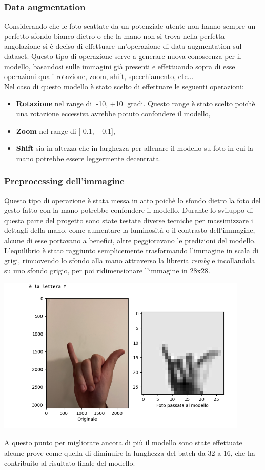 \documentclass{article}
\begin{document}
\subsubsection{Data augmentation}
Considerando che le foto scattate da un potenziale utente non hanno sempre un perfetto sfondo bianco dietro o che la mano non si trova nella perfetta angolazione si è deciso di effettuare un'operazione di data augmentation sul dataset. Questo tipo di operazione serve a generare nuova conoscenza per il modello, basandosi sulle immagini già presenti e effettuando sopra di esse operazioni quali rotazione, zoom, shift, specchiamento, etc... \\
Nel caso di questo modello è stato scelto di effettuare le seguenti operazioni:
\begin{itemize}
    \item \textbf{Rotazione} nel range di [-10, +10] gradi. Questo range è stato scelto poichè una rotazione eccessiva avrebbe potuto confondere il modello,
    \item \textbf{Zoom} nel range di [-0.1, +0.1],
    \item \textbf{Shift} sia in altezza che in larghezza per allenare il modello su foto in cui la mano potrebbe essere leggermente decentrata.
\end{itemize}
\subsubsection{Preprocessing dell'immagine}
Questo tipo di operazione è stata messa in atto poichè lo sfondo dietro la foto del gesto fatto con la mano potrebbe confondere il modello. Durante lo sviluppo di questa parte del progetto sono state testate diverse tecniche per massimizzare i dettagli della mano, come aumentare la luminosità o il contrasto dell'immagine, alcune di esse portavano a benefici, altre peggioravano le predizioni del modello.\\
L'equilibrio è stato raggiunto semplicemente trasformando l'immagine in scala di grigi, rimuovendo lo sfondo alla mano attraverso la libreria \textit{rembg} e incollandola su uno sfondo grigio, per poi ridimensionare l'immagine in 28x28.
\begin{center}
    \includegraphics[width=0.9\textwidth]{preprocess.png}
\end{center}
A questo punto per migliorare ancora di più il modello sono state effettuate alcune prove come quella di diminuire la lunghezza del batch da 32 a 16, che ha contribuito al risultato finale del modello.\\
\end{document}
